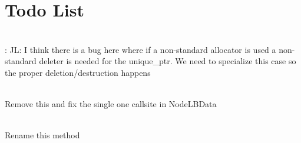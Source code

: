 \chapter{Todo List }
\hypertarget{todo}{}\label{todo}

\begin{DoxyRefList}
\item[{\parbox[t]{\linewidth}{Member \doxylink{namespacecheckpoint_1_1dispatch_af53e3da86b448379c2fd8437dfda6a4d}{checkpoint::\+dispatch::\+deserialize\+Type} (\doxylink{namespacecheckpoint_abde9c934d134a37336ab8c13f21baf02}{Serial\+Byte\+Type} \texorpdfstring{$\ast$}{*}data, \doxylink{namespacecheckpoint_abde9c934d134a37336ab8c13f21baf02}{Serial\+Byte\+Type} \texorpdfstring{$\ast$}{*}alloc\+Buf)}}]\hfill \\
\label{todo__todo000003}%
%
:\+ JL:\+ I think there is a bug here where if a non-\/standard allocator is used a non-\/standard deleter is needed for the unique\+\_\+ptr. We need to specialize this case so the proper deletion/\+destruction happens  
\item[{\parbox[t]{\linewidth}{Member \doxylink{structvt_1_1runtime_1_1_runtime_a34252fc839ea767c8fca1efb97918385}{vt::\+runtime::\+Runtime::\+system\+Sync} ()}}]\hfill \\
\label{todo__todo000001}%
%
Remove this and fix the single one callsite in {\ttfamily Node\+LBData}  
\item[{\parbox[t]{\linewidth}{Member \doxylink{structvt_1_1vrt_1_1collection_1_1_holder_a46a48d80d10924fbb928f4267a83c441}{vt::\+vrt::\+collection::\+Holder\texorpdfstring{$<$}{<} IndexT \texorpdfstring{$>$}{>}::\+cleanup\+Exists} ()}}]\hfill \\
\label{todo__todo000002}%
%
Rename this method
\end{DoxyRefList}